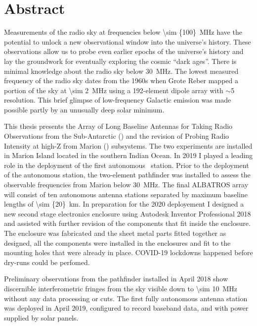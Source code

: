 \section*{Abstract}
	
Measurements of the radio sky at frequencies below \SI{\sim {100}}{\mega \hertz} have the potential to unlock a new observational window into the universe’s history. These observations allow us to probe even earlier epochs of the universe’s history and lay the groundwork for eventually exploring the cosmic “dark ages”. There is minimal knowledge about the radio sky below \SI{30}{\mega \hertz}. The lowest measured frequency of the radio sky dates from the 1960s when Grote Reber mapped a portion of the sky at \SI{\sim 2}{\mega \hertz} using a 192-element dipole array with $\sim$5 \degree resolution. This brief glimpse of low-frequency Galactic emission was made possible partly by an unusually deep solar minimum.

This thesis presents the Array of Long Baseline Antennas for Taking Radio Observations from the Sub-Antarctic (\albatros) and the revision of Probing Radio Intensity at high-Z from Marion (\prizm) subsystems. The two experiments are installed in Marion Island located in the southern Indian Ocean. In 2019 I played a leading role in the deployment of the first autonomous \albatros\ station. Prior to the deployment of the autonomous station, the two-element pathfinder was installed to assess the observable frequencies from Marion below \SI{30}{\mega \hertz}. The final ALBATROS array will consist of ten autonomous antenna stations separated by maximum baseline lengths of \SI{\sim {20}}{km}. In preparation for the 2020 deployement I designed a new second stage electronics enclosure using Autodesk Inventor Professional 2018 and assisted with further revision of the components that fit inside the enclosure. The enclosure was fabricated and the sheet metal parts fitted together as designed, all the components were installed in the enclosures and fit to the mounting holes that were already in place. COVID-19 lockdowns happened before dry-runs could be perfomed. 

Preliminary observations from the pathfinder installed in April 2018 show discernible interferometric fringes from the sky visible down to \SI{\sim 10}{\mega \hertz} without any data processing or cuts. The first fully autonomous antenna station was deployed in April 2019, configured to record baseband data, and with power supplied by solar panels. 

